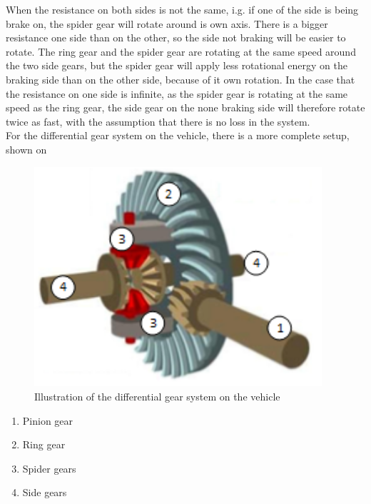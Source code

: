 When the resistance on both sides is not the same, i.g. if one of the side is being brake on, the spider gear will rotate around is own axis. There is a bigger resistance one side than on the other, so the side not braking will be easier to rotate. The ring gear and the spider gear are rotating at the same speed around the two side gears, but the spider gear will apply less rotational energy on the braking side than on the other side, because of it own rotation. In the case that the resistance on one side is infinite, as the spider gear is rotating at the same speed as the ring gear, the side gear on the none braking side will therefore rotate twice as fast, with the assumption that there is no loss in the system.\\

For the differential gear system on the vehicle, there is a more complete setup, shown on 

\begin{minipage}{\linewidth}
      \centering
      \begin{minipage}{0.65\linewidth}
          \begin{figure}[H]
              \includegraphics[width=0.95\textwidth]{figures/diffGearFull}
              \caption{Illustration of the differential gear system on the vehicle \cite{MechanicalEngineering}}
          \end{figure}
      \end{minipage}
      \hspace{0.05\linewidth}
      \begin{minipage}{0.25\linewidth}
      		\begin{enumerate}
      			\item Pinion gear
      			\item Ring gear
      			\item Spider gears
      			\item Side gears
      		\end{enumerate}
      \end{minipage}
  \end{minipage}




